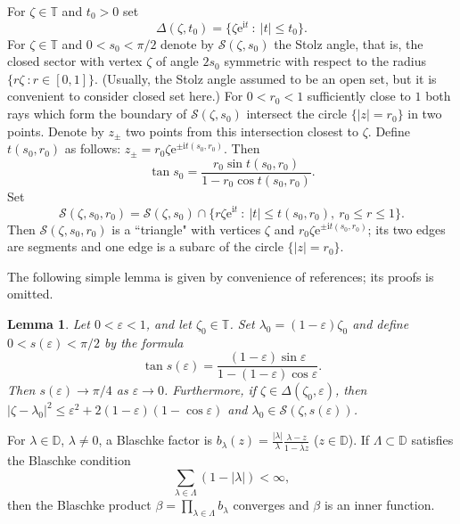 \documentclass[a4paper,oneside,11pt]{amsart}
\numberwithin{equation}{section}
\theoremstyle{plain}
\newtheorem{lemma}[theorem]{Lemma}
\theoremstyle{definition}
\begin{document}
For $\zeta\in\mathbb T$ and $t_0>0$ set 
\begin{equation}\label{ddelta}\Delta(\zeta, t_0)=\{\zeta\mathrm{e}^{\mathrm{i}t}\ :\ |t|\leq t_0\}.\end{equation} 
 For $\zeta\in\mathbb T$ and $0<s_0<\pi/2$ denote by $\mathcal S(\zeta,s_0)$ the Stolz angle, that is, the closed 
sector with vertex $\zeta$ of angle $2s_0$ 
symmetric with respect to the radius $\{r\zeta\ : r\in[0,1]\}$. (Usually, the Stolz angle assumed to be an open set, but it is convenient to consider closed set here.)  For  $0<r_0<1$ sufficiently close to $1$ 
both rays which form the boundary of $\mathcal S(\zeta,s_0)$ 
intersect the circle $\{|z|=r_0\}$ in two points.  Denote by $z_\pm$  two points from this intersection 
closest to $\zeta$. Define $t(s_0,r_0)$ as follows:  $z_\pm=r_0\zeta\mathrm{e}^{\pm\mathrm{i}t(s_0,r_0)}$. 
Then 
\begin{equation}\label{tsr}\tan s_0=\frac{r_0\sin t(s_0,r_0)}{1-r_0\cos t(s_0,r_0)}.\end{equation}
Set \begin{equation}\label{sszsr}
\mathcal S(\zeta,s_0,r_0)=\mathcal S(\zeta,s_0)\cap\{r\zeta\mathrm{e}^{\mathrm{i}t}\ :\ |t|\leq t(s_0,r_0),\  r_0\leq r\leq 1\}.\end{equation}
Then $\mathcal S(\zeta,s_0,r_0) $ is  a ``triangle" with vertices $\zeta$ and $r_0\zeta\mathrm{e}^{\pm\mathrm{i}t(s_0,r_0)}$; its two edges are segments and one edge is a subarc of 
the circle $\{|z|=r_0\}$.

The following simple lemma is given by convenience of references; its proofs is omitted.

\begin{lemma} \label{lemepsilon} Let $0<\varepsilon<1$, and let $\zeta_0\in\mathbb T$. Set $\lambda_0=(1-\varepsilon)\zeta_0$ and define
 $0<s(\varepsilon)<\pi/2$ by the formula 
\begin{equation*} \tan s(\varepsilon)=\frac{(1-\varepsilon)\sin\varepsilon}{1-(1-\varepsilon)\cos\varepsilon}.
\end{equation*}
Then $s(\varepsilon)\to\pi/4$ as $\varepsilon\to 0$. Furthermore, if  $\zeta\in\Delta(\zeta_0,\varepsilon)$, then 
$|\zeta-\lambda_0|^2\leq \varepsilon^2+2(1-\varepsilon)(1-\cos\varepsilon)$ and 
$\lambda_0\in\mathcal S(\zeta, s(\varepsilon))$.  
\end{lemma}

For $\lambda\in\mathbb D$, $\lambda\neq 0$,  a Blaschke factor is $b_\lambda(z)=\frac{|\lambda|}{\lambda}\frac{\lambda-z}{1-\overline\lambda z}$ 
($z\in\mathbb D$). If $\Lambda\subset\mathbb D$ satisfies
 the Blaschke condition 
\begin{equation} \label{6blaschke}\sum_{\lambda\in\Lambda} (1-|\lambda|)<\infty, \end{equation}
then the Blaschke product  $\beta=\prod_{\lambda\in\Lambda} b_\lambda$ converges and $\beta$ is an inner function. 
\end{document}
